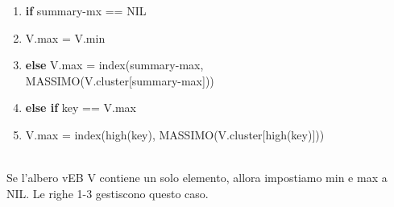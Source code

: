 \documentclass{article}
\begin{document}
\begin{flushleft}
\begin{enumerate}
                \item \hspace{60pt} \textbf{if} summary-mx == NIL
                \item \hspace{80pt} V.max = V.min
                \item \hspace{60pt} \textbf{else} V.max = index(summary-max,\\ 
                      \hspace{110pt} MASSIMO(V.cluster[summary-max]))
                \item \hspace{20pt} \textbf{else if} key == V.max
                \item \hspace{40pt} V.max = index(high(key), MASSIMO(V.cluster[high(key)]))
            \end{enumerate}
            ~\\Se l'albero vEB V contiene un solo elemento, allora impostiamo min e max a NIL. Le righe 1-3 gestiscono questo caso.\\
            
            
\end{flushleft}
\end{document}
